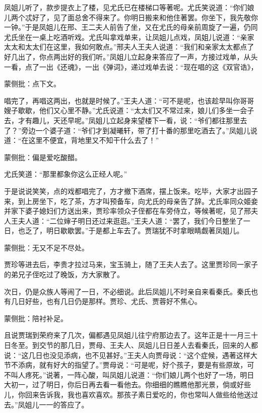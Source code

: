 \begin{parag}
    凤姐儿听了，款步提衣上了楼，见尤氏已在楼梯口等著呢。尤氏笑说道：“你们娘儿两个忒好了，见了面总舍不得来了。你明日搬来和他住著罢。你坐下，我先敬你一钟。”于是凤姐儿在邢、王二夫人前告了坐，又在尤氏的母亲前周旋了一遍，仍同尤氏坐在一桌上吃酒听戏。尤氏叫拿戏单来，让凤姐儿点戏，凤姐儿说道：“亲家太太和太太们在这里，我如何敢点。”邢夫人王夫人说道：“我们和亲家太太都点了好几出了，你点两出好的我们听。”凤姐儿立起身来答应了一声，方接过戏单，从头一看，点了一出《还魂》，一出《弹词》，递过戏单去说：“现在唱的这《双官诰》，\begin{note}蒙侧批：点下文。\end{note}唱完了，再唱这两出，也就是时候了。”王夫人道：“可不是呢，也该趁早叫你哥哥嫂子歇歇，他们又心里不静。”尤氏说道：“太太们又不常过来，娘儿们多坐一会子去，才有趣儿，天还早呢。”凤姐儿立起身来望楼下一看，说：“爷们都往那里去了？”旁边一个婆子道：“爷们才到凝曦轩，带了打十番的那里吃酒去了。”凤姐儿说道：“在这里不便宜，背地里又不知干什么去了！”\begin{note}蒙侧批：偏是爱吃酸醋。\end{note}尤氏笑道：“那里都象你这么正经人呢。”
\end{parag}


\begin{parag}
    于是说说笑笑，点的戏都唱完了，方才撤下酒席，摆上饭来。吃毕，大家才出园子来，到上房坐下，吃了茶，方才叫预备车，向尤氏的母亲告了辞。尤氏率同众姬妾并家下婆子媳妇们方送出来，贾珍率领众子侄都在车旁侍立，等候著呢，见了邢夫人王夫人道：“二位婶子明日还过来逛逛。”王夫人道：“罢了，我们今日整坐了一日，也乏了，明日歇歇罢。”于是都上车去了。贾瑞犹不时拿眼睛觑著凤姐儿。\begin{note}蒙侧批：无又不足不尽处。\end{note}贾珍等进去后，李贵才拉过马来，宝玉骑上，随了王夫人去了。这里贾珍同一家子的弟兄子侄吃过了晚饭，方大家散了。
\end{parag}


\begin{parag}
    次日，仍是众族人等闹了一日，不必细说。此后凤姐儿不时亲自来看秦氏。秦氏也有几日好些，也有几日仍是那样。贾珍、尤氏、贾蓉好不焦心。\begin{note}蒙侧批：陪衬补足。\end{note}
\end{parag}


\begin{parag}
    且说贾瑞到荣府来了几次，偏都遇见凤姐儿往宁府那边去了。这年正是十一月三十日冬至。到交节的那几日，贾母、王夫人、凤姐儿日日差人去看秦氏，回来的人都说：“这几日也没见添病，也不见甚好。”王夫人向贾母说：“这个症候，遇著这样大节不添病，就有好大的指望了。”贾母说：“可是呢，好个孩子，要是有些原故，可不叫人疼死。”说著，一阵心酸，叫凤姐儿说道：“你们娘儿两个也好了一场，明日大初一，过了明日，你后日再去看一看他去。你细细的瞧瞧他那光景，倘或好些儿，你回来告诉我，我也喜欢喜欢。那孩子素日爱吃的，你也常叫人做些给他送过去。”凤姐儿一一的答应了。
\end{parag}


